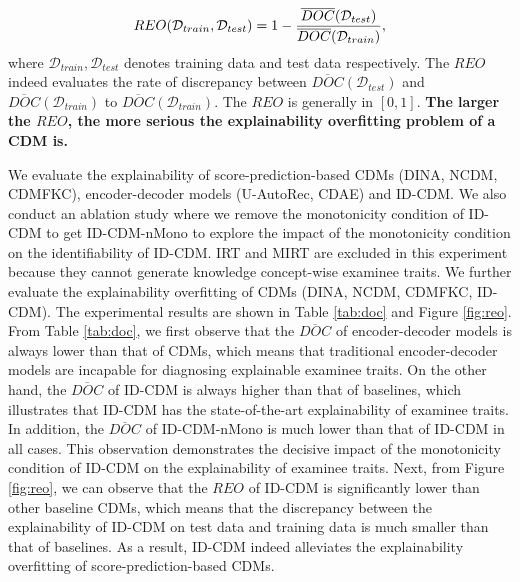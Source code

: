 \documentclass[sigconf]{acmart}
\begin{document}
\vspace{-5pt}
\begin{equation}\label{eq:reo}
  REO(\mathcal{D}_{train}, \mathcal{D}_{test}) = 1 - \frac{\overline{DOC}(\mathcal{D}_{test})}{\overline{DOC}(\mathcal{D}_{train})},
  \vspace{-5pt}
\end{equation}
where $\mathcal{D}_{train}, \mathcal{D}_{test}$ denotes training data and test data respectively. The $REO$ indeed evaluates the rate of discrepancy between $\overline{DOC}(\mathcal{D}_{test})$ and $\overline{DOC}(\mathcal{D}_{train})$ to $\overline{DOC}(\mathcal{D}_{train})$. The $REO$ is generally in $[0,1]$. \textbf{The larger the $REO$, the more serious the explainability overfitting problem of a CDM is.}

\par We evaluate the explainability of score-prediction-based CDMs (DINA, NCDM, CDMFKC), encoder-decoder models (U-AutoRec, CDAE) and ID-CDM. We also conduct an ablation study where we remove the monotonicity condition of ID-CDM to get ID-CDM-nMono to explore the impact of the monotonicity condition on the identifiability of ID-CDM. IRT and MIRT are excluded in this experiment because they cannot generate knowledge concept-wise examinee traits. We further evaluate the explainability overfitting of CDMs (DINA, NCDM, CDMFKC, ID-CDM). The experimental results are shown in Table \ref{tab:doc} and Figure \ref{fig:reo}. From Table \ref{tab:doc}, we first observe that the $\overline{DOC}$ of encoder-decoder models is always lower than that of CDMs, which means that traditional encoder-decoder models are incapable for diagnosing explainable examinee traits. On the other hand, the $\overline{DOC}$ of ID-CDM is always higher than that of baselines, which illustrates that ID-CDM has the state-of-the-art explainability of examinee traits. In addition, the $\overline{DOC}$ of ID-CDM-nMono is much lower than that of ID-CDM in all cases. This observation demonstrates the decisive impact of the monotonicity condition of ID-CDM on the explainability of examinee traits. Next, from Figure \ref{fig:reo}, we can observe that the $REO$ of ID-CDM is significantly lower than other baseline CDMs, which means that the discrepancy between the explainability of ID-CDM on test data and training data is much smaller than that of baselines. As a result, ID-CDM indeed alleviates the explainability overfitting of score-prediction-based CDMs.

\vspace{-5pt}
\end{document}
